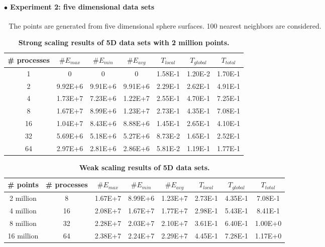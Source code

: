 \documentclass[12pt]{article}
\begin{document}
\paragraph{$\bullet$ Experiment 2: five dimensional data sets}
$ $\newline
$ $\newline
\indent The points are generated from five dimensional sphere surfaces. 100 nearest neighbors are considered.
$ $\newline
\renewcommand{\arraystretch}{1.7}
\begin{table}[h]
\centering
    \caption{\textbf{Strong scaling results of 5D data sets with 2 million points.} }
	\label{2M5D}
\begin{tabular}{ccccccc}
    \hline %
\# processes  &$\# E_{max}$   &$\# E_{min}$ &$\# E_{avg}$  &$T_{local}$  &$T_{global}$  &$T_{total}$\\
\hline\hline
1   &0   &0     &0   &1.58E-1    &1.20E-2    &1.70E-1 \\
2   &9.92E+6    &9.91E+6    &9.91E+6    &2.29E-1    &2.62E-1    &4.91E-1\\
4   &1.73E+7    &7.23E+6    &1.22E+7    &2.55E-1    &4.70E-1    &7.25E-1\\
8   &1.67E+7    &8.99E+6    &1.23E+7    &2.73E-1    &4.35E-1    &7.08E-1\\
16  &1.04E+7    &8.43E+6    &8.88E+6    &1.45E-1    &2.65E-1    &4.10E-1\\
32  &5.69E+6    &5.18E+6    &5.27E+6    &8.73E-2    &1.65E-1    &2.52E-1\\
64  &2.97E+6    &2.81E+6    &2.86E+6    &5.81E-2    &1.19E-1    &1.77E-1\\
\hline
    \end{tabular}
\end{table}

\renewcommand{\arraystretch}{1.7}
\begin{table}[h]
\centering
    \caption{\textbf{Weak scaling results of 5D data sets.} }
	\label{5Dweak}
\begin{tabular}{cccccccc}
    \hline %
\# points &\# processes  &$\# E_{max}$   &$\# E_{min}$ &$\# E_{avg}$  &$T_{local}$  &$T_{global}$  &$T_{total}$\\
\hline\hline
2 million  &8   &1.67E+7    &8.99E+6    &1.23E+7    &2.73E-1    &4.35E-1    &7.08E-1\\
4 million  &16  &2.08E+7    &1.67E+7    &1.77E+7    &2.98E-1    &5.43E-1    &8.41E-1\\
8 million  &32  &2.28E+7    &2.03E+7    &2.10E+7    &3.61E-1    &6.40E-1    &1.00E+0\\
16 million &64  &2.38E+7    &2.24E+7    &2.29E+7    &4.45E-1    &7.28E-1    &1.17E+0\\



\hline
    \end{tabular}
\end{table}
\end{document}
